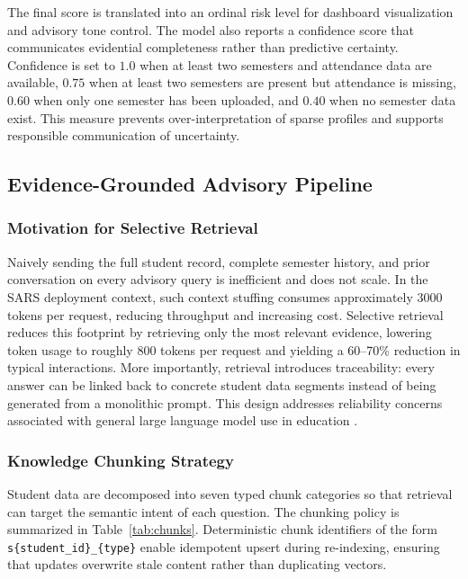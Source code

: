 \documentclass{article}
\begin{document}
The final score is translated into an ordinal risk level for dashboard visualization and advisory tone control. The model also reports a confidence score that communicates evidential completeness rather than predictive certainty. Confidence is set to $1.0$ when at least two semesters and attendance data are available, $0.75$ when at least two semesters are present but attendance is missing, $0.60$ when only one semester has been uploaded, and $0.40$ when no semester data exist. This measure prevents over-interpretation of sparse profiles and supports responsible communication of uncertainty.

\subsection{Evidence-Grounded Advisory Pipeline}
\subsubsection{Motivation for Selective Retrieval}
Naively sending the full student record, complete semester history, and prior conversation on every advisory query is inefficient and does not scale. In the SARS deployment context, such context stuffing consumes approximately 3000 tokens per request, reducing throughput and increasing cost. Selective retrieval reduces this footprint by retrieving only the most relevant evidence, lowering token usage to roughly 800 tokens per request and yielding a 60--70\% reduction in typical interactions. More importantly, retrieval introduces traceability: every answer can be linked back to concrete student data segments instead of being generated from a monolithic prompt. This design addresses reliability concerns associated with general large language model use in education \cite{kasneci2023chatgpt,lewis2020rag,gao2023rag}.

\subsubsection{Knowledge Chunking Strategy}
Student data are decomposed into seven typed chunk categories so that retrieval can target the semantic intent of each question. The chunking policy is summarized in Table~\ref{tab:chunks}. Deterministic chunk identifiers of the form \texttt{s\{student\_id\}\_\{type\}} enable idempotent upsert during re-indexing, ensuring that updates overwrite stale content rather than duplicating vectors.
\end{document}
